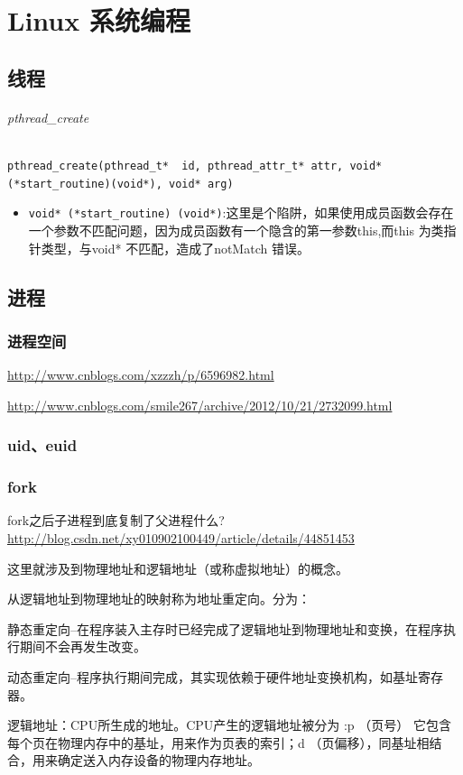 \documentclass[UTF8,a4paper,12pt]{ctexbook}
\begin{document}
\chapter{Linux 系统编程}
	\section{线程}
		\subparagraph{pthread\_create}

		\verb|pthread_create(pthread_t*  id, pthread_attr_t* attr, void*(*start_routine)(void*), void* arg)|
		
		\begin{itemize}
			\item \verb|void* (*start_routine) (void*)|:这里是个陷阱，如果使用成员函数会存在一个参数不匹配问题，因为成员函数有一个隐含的第一参数this,而this 为类指针类型，与void* 不匹配，造成了notMatch 错误。
		\end{itemize}		 
	\section{进程}
		\subsection{进程空间}
			\url{http://www.cnblogs.com/xzzzh/p/6596982.html}
			
			\url{http://www.cnblogs.com/smile267/archive/2012/10/21/2732099.html}
		\subsection{uid、euid}
		
		\subsection{fork}
			fork之后子进程到底复制了父进程什么? \url{http://blog.csdn.net/xy010902100449/article/details/44851453}
			
			
			这里就涉及到物理地址和逻辑地址（或称虚拟地址）的概念。
			
			从逻辑地址到物理地址的映射称为地址重定向。分为：
			
			静态重定向--在程序装入主存时已经完成了逻辑地址到物理地址和变换，在程序执行期间不会再发生改变。
			
			动态重定向--程序执行期间完成，其实现依赖于硬件地址变换机构，如基址寄存器。
			
			逻辑地址：CPU所生成的地址。CPU产生的逻辑地址被分为 :p （页号） 它包含每个页在物理内存中的基址，用来作为页表的索引；d （页偏移），同基址相结合，用来确定送入内存设备的物理内存地址。
			
\end{document}
